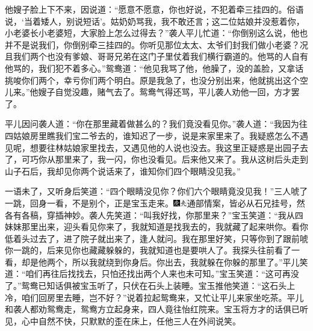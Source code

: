 他嫂子脸上下不来，因说道：“愿意不愿意，你也好说，不犯着牵三挂四的。俗语说，‘当着矮人，别说短话’。姑奶奶骂我，我不敢还言；这二位姑娘并没惹着你，小老婆长小老婆短，大家脸上怎么过得去？”袭人平儿忙道：“你倒别这么说，他也并不是说我们，你倒别牵三挂四的。你听见那位太太、太爷们封我们做小老婆？况且我们两个也没有爹娘、哥哥兄弟在这门子里仗着我们横行霸道的。他骂的人自有他骂的，我们犯不着多心。”鸳鸯道：“他见我骂了他，他臊了，没的盖脸，又拿话挑唆你们两个，幸亏你们两个明白。原是我急了，也没分别出来，他就挑出这个空儿来。”他嫂子自觉没趣，赌气去了。鸳鸯气得还骂，平儿袭人劝他一回，方才罢了。

平儿因问袭人道：“你在那里藏着做甚么的？我们竟没看见你。”袭人道：“我因为往四姑娘房里瞧我们宝二爷去的，谁知迟了一步，说是来家里来了。我疑惑怎么不遇见呢，想要往林姑娘家里找去，又遇见他的人说也没去。我这里正疑惑是出园子去了，可巧你从那里来了，我一闪，你也没看见。后来他又来了。我从这树后头走到山子石后，我却见你两个说话来了，谁知你们四个眼睛没见我。”

一语未了，又听身后笑道：“四个眼睛没见你？你们六个眼睛竟没见我！”三人唬了一跳，回身一看，不是别个，正是宝玉走来。{\includegraphics[width=3mm]{../Images/00004}\includegraphics[width=3mm]{../Images/00012}\footnotesize \kaishu 通部情案，皆必从石兄挂号，然各有各稿，穿插神妙。}袭人先笑道：“叫我好找，你那里来？”宝玉笑道：“我从四妹妹那里出来，迎头看见你来了，我就知道是找我去的，我就藏了起来哄你。看你低着头过去了，进了院子就出来了，逢人就问。我在那里好笑，只等你到了跟前唬你一跳的，后来见你也藏藏躲躲的，我就知道也是要哄人了。我探头往前看了一看，却是他两个，所以我就绕到你身后。你出去，我就躲在你躲的那里了。”平儿笑道：“咱们再往后找找去，只怕还找出两个人来也未可知。”宝玉笑道：“这可再没了。”鸳鸯已知话俱被宝玉听了，只伏在石头上装睡。宝玉推他笑道：“这石头上冷，咱们回房里去睡，岂不好？”说着拉起鸳鸯来，又忙让平儿来家坐吃茶。平儿和袭人都劝鸳鸯走，鸳鸯方立起身来，四人竟往怡红院来。宝玉将方才的话俱已听见，心中自然不快，只默默的歪在床上，任他三人在外间说笑。

